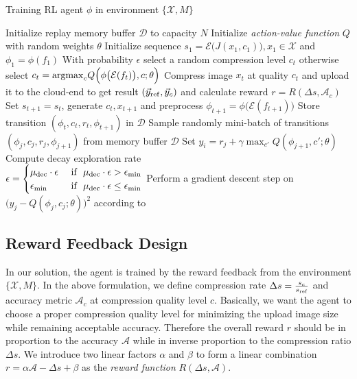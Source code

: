 \begin{algorithm}[htbp]
	\caption{Training RL agent $ \phi $ in environment $ \{\mathcal{X}, M\} $}
	\label{alg: rl-train}
	\begin{algorithmic}[1]
		\STATE Initialize replay memory buffer $ \mathcal{D} $ to capacity $ N $
		\STATE Initialize \emph{action-value function} $ Q $ with random weights $ \theta $
		\STATE Initialize sequence $ s_1 = \mathcal{E}\big(J(x_1, c_1)\big), x_1 \in \mathcal{X} $ and $ \phi_1 = \phi(f_1) $
		\STATE With probability $ \epsilon $ select a random compression level $ c_t $ otherwise select $ c_t = {\rm argmax}_cQ\Big(\phi\big(\mathcal{E}(f_t)\big), c; \theta\Big) $
		\STATE Compress image $ x_t $ at quality $ c_t $ and upload it to the cloud-end to get result $ (\vec{y}_{\rm ref}, \vec{y}_c) $ and calculate reward $ r = R(\Delta s, \mathcal{A}_c) $
		\STATE Set $ s_{t+1} = s_t $, generate $ c_t, x_{t+1} $ and preprocess $ \phi_{t+1} = \phi \big(\mathcal{E}(f_{t+1})\big) $
		\STATE Store transition $ (\phi_t, c_t, r_t, \phi_{t+1}) $ in $ \mathcal{D} $
		\STATE Sample randomly mini-batch of transitions \\ $ (\phi_j, c_j, r_j, \phi_{j+1}) $ from memory buffer $ \mathcal{D} $
		\STATE Set $ y_i = r_j + \gamma \max_{c'}Q(\phi_{j+1}, c'; \theta) $
		\STATE Compute decay exploration rate \\
		$ \epsilon = 
		\begin{cases}
		\mu_{\rm dec}\cdot \epsilon & \text{ if } \ \mu_{\rm dec}\cdot \epsilon > \epsilon_{\min} \\ 
		\epsilon_{\min}             & \text{ if } \ \mu_{\rm dec}\cdot \epsilon \leq \epsilon_{\min}
		\end{cases} $
		\STATE Perform a gradient descent step on \\ $ \big(y_j - Q(\phi_j, c_j; \theta)\big)^2 $ according to~\cite{DQN}
		\ENDIF
		\ENDFOR
	\end{algorithmic}
\end{algorithm}

\subsection{Reward Feedback Design}

In our solution, the agent is trained by the reward feedback from the environment $ \{\mathcal{X}, M\} $. In the above formulation, we define compression rate $ \Delta s = \frac{s_c}{s_{\rm ref}} $ and accuracy metric $ \mathcal{A}_c $ at compression quality level $ c $. Basically, we want the agent to choose a proper compression quality level for minimizing the upload image size while remaining acceptable accuracy. Therefore the overall reward $ r $ should be in proportion to the accuracy $ \mathcal{A} $ while in inverse proportion to the compression ratio $ \Delta s $. We introduce two linear factors $ \alpha $ and $ \beta $ to form a linear combination $ r = \alpha \mathcal{A} - \Delta s + \beta $ as the \emph{reward function} $ R(\Delta s, \mathcal{A}) $. %

